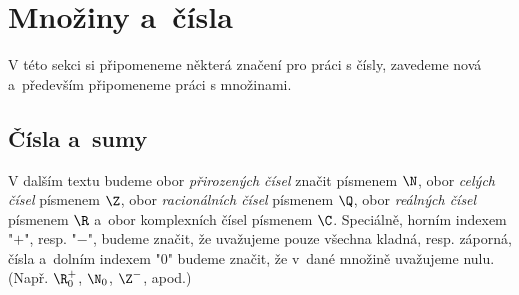 \section{Množiny a~čísla}\label{sec:mnoziny_a_cisla}

V této sekci si připomeneme některá značení pro práci s čísly, zavedeme nová a~především připomeneme práci s množinami.

\subsection{Čísla a~sumy}

\begin{convention}
    V dalším textu budeme obor \emph{přirozených čísel} značit písmenem $\N$, obor \emph{celých čísel} písmenem $\Z$, obor \emph{racionálních čísel} písmenem $\Q$, obor \emph{reálných čísel} písmenem $\R$ a~obor komplexních čísel písmenem $\C$. Speciálně, horním indexem "$+$", resp. "$-$", budeme značit, že uvažujeme pouze všechna kladná, resp. záporná, čísla a~dolním indexem "$0$" budeme značit, že v~dané množině uvažujeme nulu. (Např. $\R_0^+$, $\N_0$, $\Z^-$, apod.) 
\end{convention}

